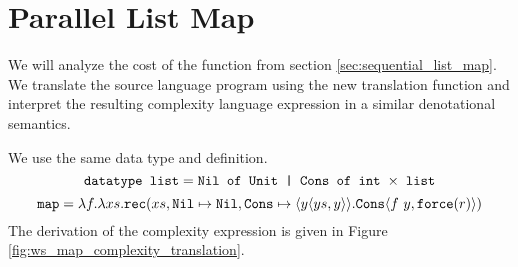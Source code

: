 %
%
\section{Parallel List Map}
We will analyze the cost of the  function from section
\ref{sec:sequential_list_map}. We translate the source language program using
the new translation function and interpret the resulting complexity language
expression in a similar denotational semantics.

We use the same data type  and  definition.
%
\begin{equation*}
  \texttt{datatype list} = \texttt{Nil of Unit | Cons of int $\times$ list}
\end{equation*}
%
\begin{equation*}
  \texttt{map} = \lambda f. \lambda xs . \texttt{rec}(xs, \texttt{Nil} \mapsto \texttt{Nil}, \texttt{Cons} \mapsto \langle y \langle ys, y \rangle\rangle. \texttt{Cons}\langle f\ y, \texttt{force}(r)\rangle)
\end{equation*}
%
The derivation of the complexity expression is given in Figure
\ref{fig:ws_map_complexity_translation}.
%

